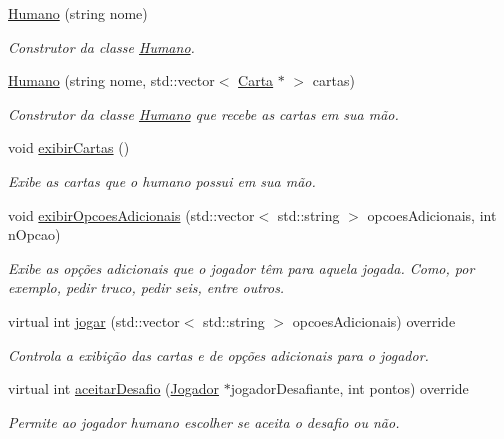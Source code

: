 \begin{DoxyCompactItemize}
\item 
\mbox{\hyperlink{class_humano_a0a77741425558703321b7a1f24bf5f8f}{Humano}} (string nome)
\begin{DoxyCompactList}\small\item\em Construtor da classe \mbox{\hyperlink{class_humano}{Humano}}. \end{DoxyCompactList}\item 
\mbox{\hyperlink{class_humano_a7af6096fca83f9c64cf893156f749e22}{Humano}} (string nome, std\+::vector$<$ \mbox{\hyperlink{class_carta}{Carta}} $\ast$ $>$ cartas)
\begin{DoxyCompactList}\small\item\em Construtor da classe \mbox{\hyperlink{class_humano}{Humano}} que recebe as cartas em sua mão. \end{DoxyCompactList}\item 
void \mbox{\hyperlink{class_humano_a32767bbf1ad4f6065d18f375341ac00e}{exibir\+Cartas}} ()
\begin{DoxyCompactList}\small\item\em Exibe as cartas que o humano possui em sua mão. \end{DoxyCompactList}\item 
void \mbox{\hyperlink{class_humano_a9be2c952d918117be73a00f2c538834c}{exibir\+Opcoes\+Adicionais}} (std\+::vector$<$ std\+::string $>$ opcoes\+Adicionais, int n\+Opcao)
\begin{DoxyCompactList}\small\item\em Exibe as opções adicionais que o jogador têm para aquela jogada. Como, por exemplo, pedir truco, pedir seis, entre outros. \end{DoxyCompactList}\item 
virtual int \mbox{\hyperlink{class_humano_aad706f019b99747f9c49d915f678998d}{jogar}} (std\+::vector$<$ std\+::string $>$ opcoes\+Adicionais) override
\begin{DoxyCompactList}\small\item\em Controla a exibição das cartas e de opções adicionais para o jogador. \end{DoxyCompactList}\item 
virtual int \mbox{\hyperlink{class_humano_aa1cd4b8c801b73190ad1472f6fc860b1}{aceitar\+Desafio}} (\mbox{\hyperlink{class_jogador}{Jogador}} $\ast$jogador\+Desafiante, int pontos) override
\begin{DoxyCompactList}\small\item\em Permite ao jogador humano escolher se aceita o desafio ou não. \end{DoxyCompactList}\end{DoxyCompactItemize}
